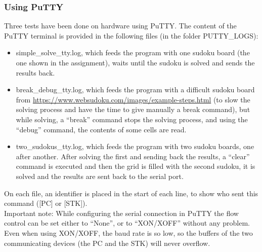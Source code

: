 \documentclass[12pt, a4, hidelinks]{article}
\begin{document}
\subsubsection*{Using PuTTY}
Three tests have been done on hardware using PuTTY. The content of the PuTTY terminal is provided in the following files (in the folder PUTTY\_LOGS):
\begin{itemize}
\item simple\_solve\_tty.log, which feeds the program with one sudoku board (the one shown in the assignment), waits until the sudoku is solved and sends the results back.
\item break\_debug\_tty.log, which feeds the program with a difficult sudoku board from \url{https://www.websudoku.com/images/example-steps.html} (to slow the solving process and have the time to give manually a break command), but while solving, a “break” command stops the solving process, and using the “debug” command, the contents of some cells are read.
\item two\_sudokus\_tty.log, which feeds the program with two sudoku boards, one after another. After solving the first and sending back the results, a “clear” command is executed and then the grid is filled with the second sudoku, it is solved and the results are sent back to the serial port.
\end{itemize}
On each file, an identifier is placed in the start of each line, to show who sent this command ([PC] or [STK]).\\
Important note: While configuring the serial connection in PuTTY the flow control can be set either to ``None'', or to ``XON/XOFF'' without any problem. Even when using XON/XOFF, the baud rate is so low, so the buffers of the two communicating devices (the PC and the STK) will never overflow.
\end{document}
